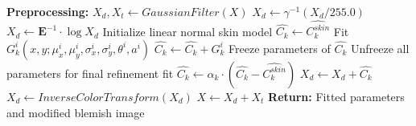 \begin{spacing}{1.5}
\begin{algorithm}
\begin{algorithmic}[1]
    \State \textbf{Preprocessing:}
        \State $X_d, X_t \gets GaussianFilter(X)$ 
        \State $X_d \gets \gamma^{-1}(X_d/255.0)$ 
        \State $X_d \gets \mathbf{E}^{-1}\cdot\log{X_d}$ 
        \State Initialize linear normal skin model $\hat{C_k}\gets\hat{C_k^{skin}}$
            \State Fit $G_k^i(x, y; \mu_x^i, \mu_y^i, \sigma_x^i, \sigma_y^i, \theta^i, a^i)$
            \State $\hat{C_k} \gets \hat{C_k}+G_k^i$
            \State Freeze parameters of $\hat{C_k}$
        \EndFor
        \State Unfreeze all parameters for final refinement fit
        \State $\hat{C_k} \gets \alpha_k\cdot(\hat{C_k}-\hat{C_k^{skin}})$
    \EndFor
    \State $X_d \gets X_d+\hat{C_k}$
    \State $X_d \gets InverseColorTransform(X_d)$
    \State $X \gets X_d+X_t$
    \State \textbf{Return:} Fitted parameters and modified blemish image
    \end{algorithmic}
    \end{algorithm}

\end{spacing}
